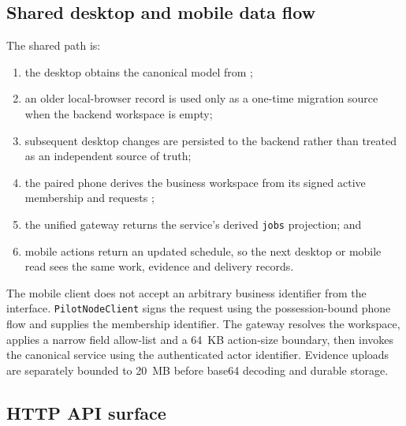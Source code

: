 \subsection{Shared desktop and mobile data flow}

The shared path is:
\begin{enumerate}[leftmargin=*]
  \item the desktop obtains the canonical model from
        ;
  \item an older local-browser record is used only as a one-time migration source
        when the backend workspace is empty;
  \item subsequent desktop changes are persisted to the backend rather than
        treated as an independent source of truth;
  \item the paired phone derives the business workspace from its signed active
        membership and requests ;
  \item the unified gateway returns the service's derived \texttt{jobs}
        projection; and
  \item mobile actions return an updated schedule, so the next desktop or mobile
        read sees the same work, evidence and delivery records.
\end{enumerate}

The mobile client does not accept an arbitrary business identifier from the
interface.  \texttt{PilotNodeClient} signs the request using the possession-bound
phone flow and supplies the membership identifier.  The gateway resolves the
workspace, applies a narrow field allow-list and a 64~KB action-size boundary,
then invokes the canonical service using the authenticated actor identifier.
Evidence uploads are separately bounded to 20~MB before base64 decoding and
durable storage.

\subsection{HTTP API surface}

